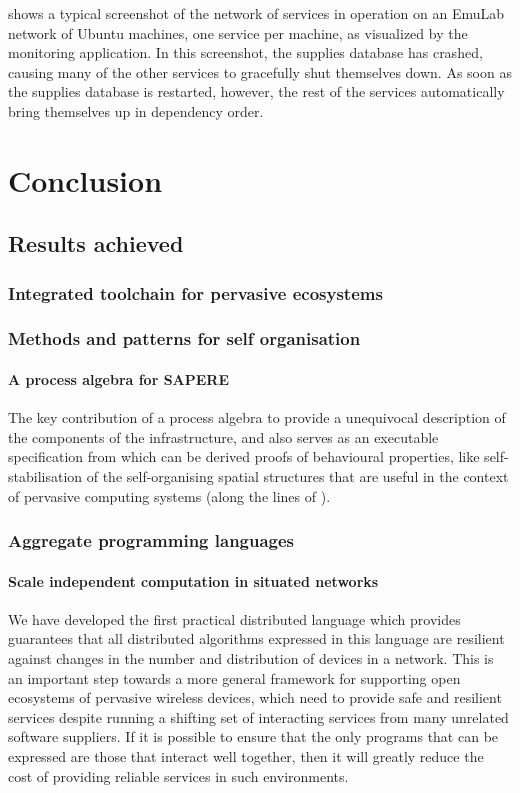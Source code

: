 \documentclass[12pt,a4paper,twoside,openright]{book}
\begin{document}
 shows a typical screenshot of the network of services in operation on an EmuLab network of Ubuntu machines, one service per machine, as visualized by the monitoring application.
%
In this screenshot, the supplies database has crashed, causing many of the other services to gracefully shut themselves down.  As soon as the supplies database is restarted, however, the rest of the services automatically bring themselves up in dependency order.

\part{Conclusion}
\chapter{Results achieved}

\section{Integrated toolchain for pervasive ecosystems}

\section{Methods and patterns for self organisation}

\subsection{A process algebra for SAPERE}

The key contribution of a process algebra to provide a unequivocal description of the components of the infrastructure, and also serves as an executable specification from which can be derived proofs of behavioural properties, like self-stabilisation of the self-organising spatial structures that are useful in the context of pervasive computing systems (along the lines of \cite{V-SCW2013}).

\section{Aggregate programming languages}


\subsection{Scale independent computation in situated networks}
We have developed the first practical distributed language which provides guarantees that all distributed algorithms expressed in this language are resilient against changes in the number and distribution of devices in a network.
%
This is an important step towards a more general framework for supporting open ecosystems of pervasive wireless devices, which need to provide safe and resilient services despite running a shifting set of interacting services from many unrelated software suppliers.
%
If it is possible to ensure that the only programs that can be expressed are those that interact well together, then it will greatly reduce the cost of providing reliable services in such environments.
\end{document}
